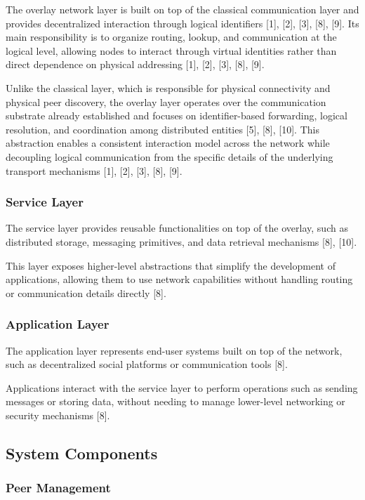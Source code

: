 \documentclass[12pt,a4paper]{article}
\begin{document}
The overlay network layer is built on top of the classical communication layer and
provides decentralized interaction through logical identifiers [1], [2], [3], [8], [9]. Its main
responsibility is to organize routing, lookup, and communication at the logical level,
allowing nodes to interact through virtual identities rather than direct dependence on
physical addressing [1], [2], [3], [8], [9].

Unlike the classical layer, which is responsible for physical connectivity and physical
peer discovery, the overlay layer operates over the communication substrate already
established and focuses on identifier-based forwarding, logical resolution, and
coordination among distributed entities [5], [8], [10]. This abstraction enables a consistent
interaction model across the network while decoupling logical communication from
the specific details of the underlying transport mechanisms [1], [2], [3], [8], [9].

\subsubsection{Service Layer}

The service layer provides reusable functionalities on top of the overlay, such as distributed storage, messaging primitives, and data retrieval mechanisms [8], [10].

This layer exposes higher-level abstractions that simplify the development of applications, allowing them to use network capabilities without handling routing or communication details directly [8].

\subsubsection{Application Layer}

The application layer represents end-user systems built on top of the network, such as decentralized social platforms or communication tools [8].

Applications interact with the service layer to perform operations such as sending messages or storing data, without needing to manage lower-level networking or security mechanisms [8].


\subsection{System Components}
\subsubsection{Peer Management}
\end{document}
